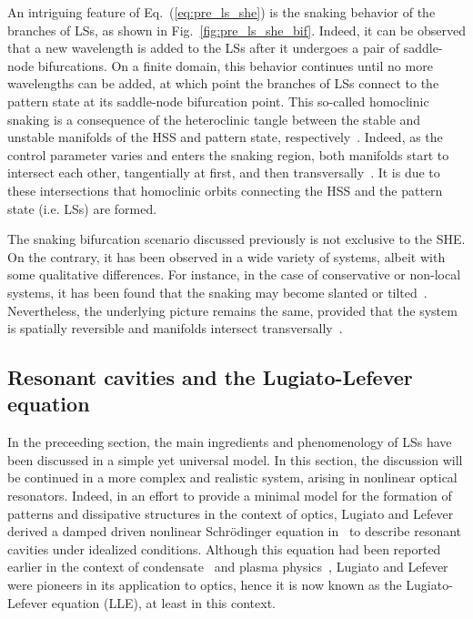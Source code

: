 An intriguing feature of Eq.~(\ref{eq:pre_ls_she}) is the snaking behavior of the branches of LSs, as shown
in Fig.~\ref{fig:pre_ls_she_bif}. Indeed, it can be observed that a new wavelength 
is added to the LSs after it undergoes a pair of saddle-node bifurcations. On a finite
domain, this behavior continues until no more wavelengths can be added, at which point the branches
of LSs connect to the pattern state at its saddle-node bifurcation point.
This so-called homoclinic snaking is a consequence of the heteroclinic tangle
between the stable and unstable manifolds of the HSS and pattern state, 
respectively~\cite{woods1999heteroclinic,coullet2000stable}. Indeed, as the
control parameter varies and enters the snaking region, both manifolds start
to intersect each other, tangentially at first, and then transversally~\cite{knobloch2015spatial}. 
It is due
to these intersections that homoclinic orbits connecting the HSS and the pattern state
(i.e. LSs) are formed.

The snaking bifurcation scenario discussed previously is not exclusive to the SHE. 
On the contrary, it has been observed in a wide variety of systems, albeit with 
some qualitative differences. For instance, in the case of conservative or non-local systems,
it has been found that the snaking may become slanted or 
tilted~\cite{firth2007proposed,dawes2008localized,beaume2013convectons}. 
Nevertheless, the underlying picture remains the same,
provided that the system is spatially reversible and manifolds intersect 
transversally~\cite{knobloch2015spatial}.



\subsection{Resonant cavities and the Lugiato-Lefever equation}

In the preceeding section, the main ingredients and phenomenology of LSs have been discussed
in a simple yet universal model. In this section, the discussion will be continued in a
more complex and realistic system, arising in nonlinear optical resonators. Indeed, in an effort
to provide a minimal model for the formation of patterns and dissipative
structures in the context of optics, Lugiato and Lefever derived a damped driven nonlinear
Schrödinger equation in~\cite{lugiatolefever1987} to describe resonant cavities under idealized conditions.
Although this equation had been reported earlier in the context of condensate~\cite{kaup1978theory}
and plasma physics~\cite{morales1974ponderomotive}, Lugiato and Lefever were pioneers in its application
to optics, hence it is now known as the Lugiato-Lefever equation (LLE), at least in this context. 


